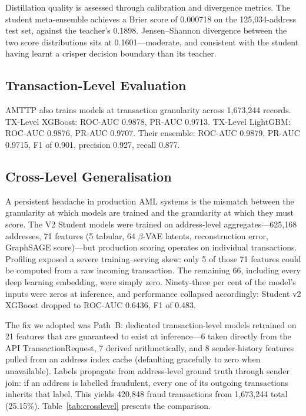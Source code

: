 \documentclass[journal]{IEEEtran}
\begin{document}
Distillation quality is assessed through calibration and divergence metrics. The student meta-ensemble achieves a Brier score of 0.000718 on the 125,034-address test set, against the teacher's 0.1898. Jensen--Shannon divergence between the two score distributions sits at 0.1601---moderate, and consistent with the student having learnt a crisper decision boundary than its teacher.

\subsection{Transaction-Level Evaluation}

AMTTP also trains models at transaction granularity across 1,673,244 records. TX-Level XGBoost: ROC-AUC 0.9878, PR-AUC 0.9713. TX-Level LightGBM: ROC-AUC 0.9876, PR-AUC 0.9707. Their ensemble: ROC-AUC 0.9879, PR-AUC 0.9715, F1 of 0.901, precision 0.927, recall 0.877.

\subsection{Cross-Level Generalisation}

A persistent headache in production AML systems is the mismatch between the granularity at which models are trained and the granularity at which they must score. The V2 Student models were trained on address-level aggregates---625,168 addresses, 71 features (5 tabular, 64 $\beta$-VAE latents, reconstruction error, GraphSAGE score)---but production scoring operates on individual transactions. Profiling exposed a severe training--serving skew: only 5 of those 71 features could be computed from a raw incoming transaction. The remaining 66, including every deep learning embedding, were simply zero. Ninety-three per cent of the model's inputs were zeros at inference, and performance collapsed accordingly: Student v2 XGBoost dropped to ROC-AUC 0.6436, F1 of 0.483.

The fix we adopted was Path~B: dedicated transaction-level models retrained on 21 features that are guaranteed to exist at inference---6 taken directly from the API TransactionRequest, 7 derived arithmetically, and 8 sender-history features pulled from an address index cache (defaulting gracefully to zero when unavailable). Labels propagate from address-level ground truth through sender join: if an address is labelled fraudulent, every one of its outgoing transactions inherits that label. This yields 420,848 fraud transactions from 1,673,244 total (25.15\%). Table~\ref{tab:crosslevel} presents the comparison.
\end{document}
